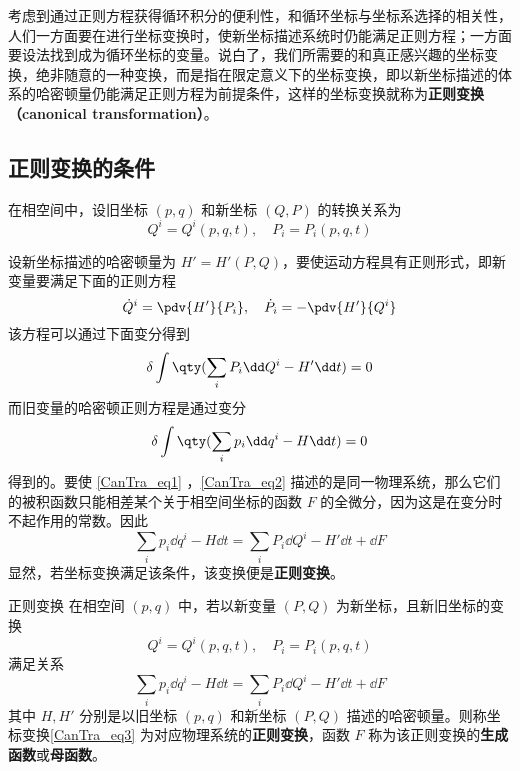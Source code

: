 考虑到通过正则方程获得循环积分的便利性，和循环坐标与坐标系选择的相关性，人们一方面要在进行坐标变换时，使新坐标描述系统时仍能满足正则方程；一方面要设法找到成为循环坐标的变量。说白了，我们所需要的和真正感兴趣的坐标变换，绝非随意的一种变换，而是指在限定意义下的坐标变换，即以新坐标描述的体系的哈密顿量仍能满足正则方程为前提条件，这样的坐标变换就称为\textbf{正则变换（canonical transformation）}。

\subsection{正则变换的条件}
在相空间中，设旧坐标 $(p,q)$ 和新坐标 $(Q,P)$ 的转换关系为
\begin{equation}
Q^i=Q^i(p,q,t),\quad P_i=P_i(p,q,t)
\end{equation}

设新坐标描述的哈密顿量为 $H'=H'(P,Q)$，要使运动方程具有正则形式，即新变量要满足下面的正则方程
\begin{equation}
\dot Q^i=\pdv{H'}{P_i},\quad \dot P_i=-\pdv{H'}{Q^i}
\end{equation}
该方程可以通过下面变分得到
\begin{equation}\label{CanTra_eq1}
\delta\int\qty(\sum_iP_i\dd Q^i-H'\dd t)=0
\end{equation}
而旧变量的哈密顿正则方程是通过变分
\begin{equation}\label{CanTra_eq2}
\delta\int\qty(\sum_ip_i\dd q^i-H\dd t)=0
\end{equation}
得到的。要使 \autoref{CanTra_eq1} ，\autoref{CanTra_eq2} 描述的是同一物理系统，那么它们的被积函数只能相差某个关于相空间坐标的函数 $F$ 的全微分，因为这是在变分时不起作用的常数。因此
\begin{equation}
\sum_ip_i\dd q^i-H\dd t=\sum_iP_i\dd Q^i-H'\dd t+\dd F
\end{equation}
显然，若坐标变换满足该条件，该变换便是\textbf{正则变换}。

\begin{definition}{正则变换}
在相空间 $(p,q)$ 中，若以新变量 $(P,Q)$ 为新坐标，且新旧坐标的变换
\begin{equation}\label{CanTra_eq3}
Q^i=Q^i(p,q,t),\quad P_i=P_i(p,q,t)
\end{equation}
满足关系
\begin{equation}\label{CanTra_eq4}
\sum_ip_i\dd q^i-H\dd t=\sum_iP_i\dd Q^i-H'\dd t+\dd F
\end{equation}
其中 $H,H'$ 分别是以旧坐标 $(p,q)$ 和新坐标 $(P,Q)$ 描述的哈密顿量。则称坐标变换\autoref{CanTra_eq3} 为对应物理系统的\textbf{正则变换}，函数 $F$ 称为该正则变换的\textbf{生成函数}或\textbf{母函数}。
\end{definition}

